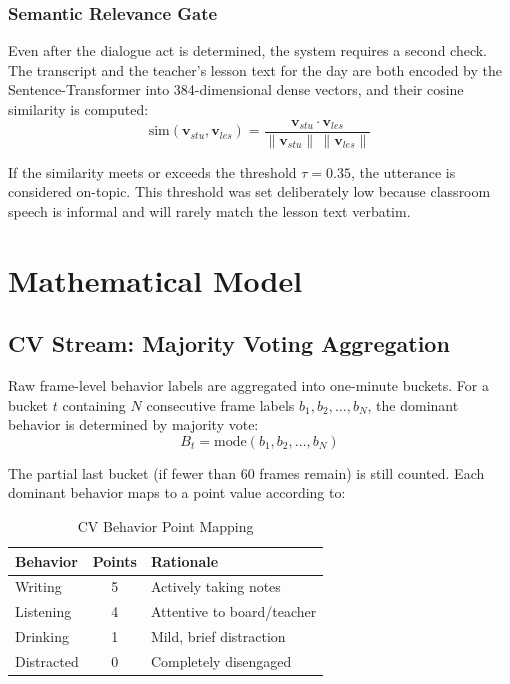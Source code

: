 \documentclass[conference]{IEEEtran}
\begin{document}
\subsubsection{Semantic Relevance Gate}
Even after the dialogue act is determined, the system requires a second check. The transcript and the teacher's lesson text for the day are both encoded by the Sentence-Transformer into 384-dimensional dense vectors, and their cosine similarity is computed:
\begin{equation}
\text{sim}(\mathbf{v}_{stu}, \mathbf{v}_{les}) = \frac{\mathbf{v}_{stu} \cdot \mathbf{v}_{les}}{\|\mathbf{v}_{stu}\| \, \|\mathbf{v}_{les}\|}
\label{eq:cosine}
\end{equation}

If the similarity meets or exceeds the threshold $\tau = 0.35$, the utterance is considered on-topic. This threshold was set deliberately low because classroom speech is informal and will rarely match the lesson text verbatim.

\section{Mathematical Model}

\subsection{CV Stream: Majority Voting Aggregation}
Raw frame-level behavior labels are aggregated into one-minute buckets. For a bucket $t$ containing $N$ consecutive frame labels $b_1, b_2, \ldots, b_N$, the dominant behavior is determined by majority vote:
\begin{equation}
B_t = \text{mode}(b_1, b_2, \ldots, b_N)
\label{eq:mode}
\end{equation}

The partial last bucket (if fewer than 60 frames remain) is still counted. Each dominant behavior maps to a point value according to:

\begin{table}[htbp]
\caption{CV Behavior Point Mapping}
\begin{center}
\begin{tabular}{|l|c|l|}
\hline
\textbf{Behavior} & \textbf{Points} & \textbf{Rationale} \\
\hline
Writing & 5 & Actively taking notes \\
Listening & 4 & Attentive to board/teacher \\
Drinking & 1 & Mild, brief distraction \\
Distracted & 0 & Completely disengaged \\
\hline
\end{tabular}
\label{tab:cv_points}
\end{center}
\end{table}
\end{document}
